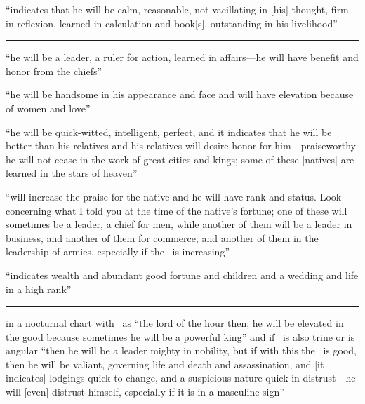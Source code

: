 \begin{description}[style=multiline,leftmargin=2.5cm]
\item[\Saturn\Trine\Mercury] ``indicates that he will be calm, reasonable, not vacillating in [his] thought, firm in reflexion, learned in calculation and book[s], outstanding in his livelihood''

\vspace{0.5em}\hrule

\item[\Jupiter\Trine\Mars] ``he will be a leader, a ruler for action, learned in affairs---he will have benefit and honor from the chiefs''

\item[\Jupiter\Trine\Venus] ``he will be handsome in his appearance and face and will have elevation because of women and love''

\item[\Jupiter\Trine\Mercury] ``he will be quick-witted, intelligent, perfect, and it indicates that he will be better than his relatives and his relatives will desire honor for him---praiseworthy he will not cease in the work of great cities and kings; some of these [natives] are learned in the stars of heaven''

\item[\Jupiter\Trine\Moon] ``will increase the praise for the native and he will have rank and status. Look concerning what I told you at the time of the native's fortune; one of these will sometimes be a leader, a chief for men, while another of them will be a leader in business, and another of them for commerce, and another of them in the leadership of armies, especially if the \Moon\, is increasing''

\item[\Jupiter\Trine\Sun] ``indicates wealth and abundant good fortune and children and a wedding and life in a high rank''

\vspace{0.5em}\hrule

\item[\Mars\Trine\Sun] in a nocturnal chart with \Mars\, as ``the lord of the hour then, he will be elevated in the good because sometimes he will be a powerful king'' and if \Jupiter\, is also trine or is angular ``then he will be a leader mighty in nobility, but if with this the \Moon\, is good, then he will be valiant, governing life and death and assassination, and [it indicates] lodgings quick to change, and a suspicious nature quick in distrust---he will [even] distrust himself, especially if it is in  a masculine sign''


\end{description}
